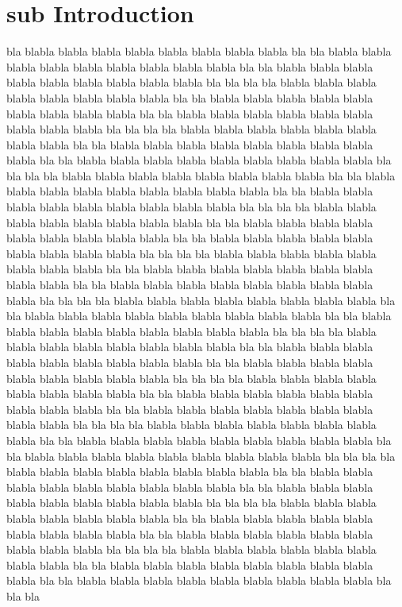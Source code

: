\documentclass[12pt,a4paper,english]{book}
\begin{document}
\section{sub Introduction}
bla blabla blabla blabla blabla blabla blabla blabla blabla bla
bla blabla blabla blabla blabla blabla blabla blabla blabla blabla bla
bla blabla blabla blabla blabla blabla blabla blabla blabla blabla bla
bla bla
bla blabla blabla blabla blabla blabla blabla blabla blabla bla
bla blabla blabla blabla blabla blabla blabla blabla blabla blabla bla
bla blabla blabla blabla blabla blabla blabla blabla blabla blabla bla
bla bla
bla blabla blabla blabla blabla blabla blabla blabla blabla bla
bla blabla blabla blabla blabla blabla blabla blabla blabla blabla bla
bla blabla blabla blabla blabla blabla blabla blabla blabla blabla bla
bla bla
bla blabla blabla blabla blabla blabla blabla blabla blabla bla
bla blabla blabla blabla blabla blabla blabla blabla blabla blabla bla
bla blabla blabla blabla blabla blabla blabla blabla blabla blabla bla
bla bla
bla blabla blabla blabla blabla blabla blabla blabla blabla bla
bla blabla blabla blabla blabla blabla blabla blabla blabla blabla bla
bla blabla blabla blabla blabla blabla blabla blabla blabla blabla bla
bla bla
bla blabla blabla blabla blabla blabla blabla blabla blabla bla
bla blabla blabla blabla blabla blabla blabla blabla blabla blabla bla
bla blabla blabla blabla blabla blabla blabla blabla blabla blabla bla
bla bla
bla blabla blabla blabla blabla blabla blabla blabla blabla bla
bla blabla blabla blabla blabla blabla blabla blabla blabla blabla bla
bla blabla blabla blabla blabla blabla blabla blabla blabla blabla bla
bla bla
bla blabla blabla blabla blabla blabla blabla blabla blabla bla
bla blabla blabla blabla blabla blabla blabla blabla blabla blabla bla
bla blabla blabla blabla blabla blabla blabla blabla blabla blabla bla
bla bla
bla blabla blabla blabla blabla blabla blabla blabla blabla bla
bla blabla blabla blabla blabla blabla blabla blabla blabla blabla bla
bla blabla blabla blabla blabla blabla blabla blabla blabla blabla bla
bla bla
bla blabla blabla blabla blabla blabla blabla blabla blabla bla
bla blabla blabla blabla blabla blabla blabla blabla blabla blabla bla
bla blabla blabla blabla blabla blabla blabla blabla blabla blabla bla
bla bla
bla blabla blabla blabla blabla blabla blabla blabla blabla bla
bla blabla blabla blabla blabla blabla blabla blabla blabla blabla bla
bla blabla blabla blabla blabla blabla blabla blabla blabla blabla bla
bla bla
bla blabla blabla blabla blabla blabla blabla blabla blabla bla
bla blabla blabla blabla blabla blabla blabla blabla blabla blabla bla
bla blabla blabla blabla blabla blabla blabla blabla blabla blabla bla
bla bla
bla blabla blabla blabla blabla blabla blabla blabla blabla bla
bla blabla blabla blabla blabla blabla blabla blabla blabla blabla bla
bla blabla blabla blabla blabla blabla blabla blabla blabla blabla bla
bla bla
\end{document}
